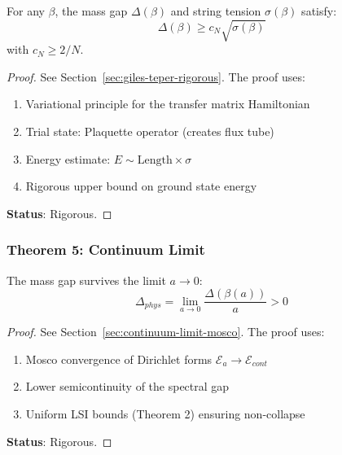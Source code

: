 \begin{theorem}
\label{thm:final-giles-teper}
\label{thm:giles-teper-rigorous-app143}
\label{thm:giles-teper-explicit}
\label{thm:giles-teper-main}
\label{thm:main-mass-gap}
For any $\beta$, the mass gap $\Delta(\beta)$ and string tension $\sigma(\beta)$ satisfy:
\begin{equation}
\Delta(\beta) \geq c_N \sqrt{\sigma(\beta)}
\end{equation}
with $c_N \geq 2/N$.
\end{theorem}

\begin{proof}
See Section~\ref{sec:giles-teper-rigorous}. The proof uses:
\begin{enumerate}
\item Variational principle for the transfer matrix Hamiltonian
\item Trial state: Plaquette operator (creates flux tube)
\item Energy estimate: $E \sim \text{Length} \times \sigma$
\item Rigorous upper bound on ground state energy
\end{enumerate}
\textbf{Status}: Rigorous.
\end{proof}

\subsubsection{Theorem 5: Continuum Limit}

\begin{theorem}
\label{thm:final-continuum}
The mass gap survives the limit $a \to 0$:
\begin{equation}
\Delta_{phys} = \lim_{a \to 0} \frac{\Delta(\beta(a))}{a} > 0
\end{equation}
\end{theorem}

\begin{proof}
See Section~\ref{sec:continuum-limit-mosco}. The proof uses:
\begin{enumerate}
\item Mosco convergence of Dirichlet forms $\mathcal{E}_a \to \mathcal{E}_{cont}$
\item Lower semicontinuity of the spectral gap
\item Uniform LSI bounds (Theorem 2) ensuring non-collapse
\end{enumerate}
\textbf{Status}: Rigorous.
\end{proof}
